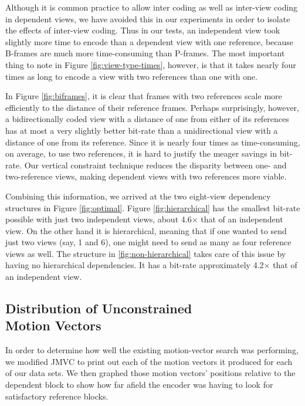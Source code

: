 \documentclass{sig-alternate-05-2015}
\begin{document}
Although it is common practice to allow inter coding as well as inter-view
coding in dependent views, we have avoided this in our experiments in order
to isolate the effects of inter-view coding. Thus in our tests, an independent
view took slightly more time to encode than a dependent view with one reference,
because B-frames are much more time-consuming than P-frames. The most important
thing to note in Figure \ref{fig:view-type-times}, however, is that it takes
nearly four times as long to encode a view with two references than one with
one.

In Figure \ref{fig:biframes}, it is clear that frames with two references scale
more efficiently to the distance of their reference frames. Perhaps
surprisingly, however, a bidirectionally coded view with a distance of one from
either of its references has at most a very slightly better bit-rate than a
unidirectional view with a distance of one from its reference. Since it is
nearly four times as time-consuming, on average, to use two references, it is
hard to justify the meager savings in bit-rate. Our vertical constraint
technique reduces the disparity between one- and two-reference views, making
dependent views with two references more viable.

Combining this information, we arrived at the two eight-view dependency
structures in Figure \ref{fig:optimal}. Figure \ref{fig:hierarchical} has the
smallest bit-rate possible with just two independent views, about 4.6$\times$
that of an independent view. On the other hand it is hierarchical, meaning that
if one wanted to send just two views (say, 1 and  6), one might need to send as
many as four reference views as well. The structure in
\ref{fig:non-hierarchical} takes care of this issue by having no hierarchical
dependencies. It has a bit-rate approximately 4.2$\times$ that of an independent
view.

\subsection{Distribution of Unconstrained \\ Motion Vectors} %
\label{subsec:unconstrained} %
In order to determine how well the existing motion-vector search was performing,
we modified JMVC to print out each of the motion vectors it produced for each of
our data sets. We then graphed those motion vectors' positions relative to the
dependent block to show how far afield the encoder was having to look for
satisfactory reference blocks.
\end{document}
